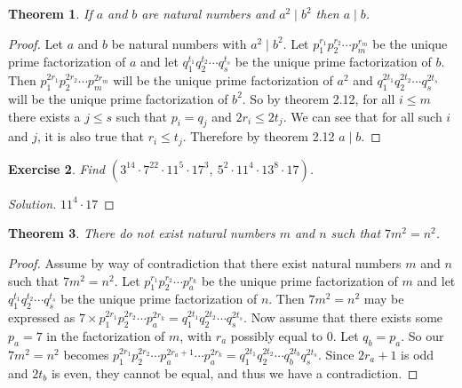 \documentclass[12pt,leqno]{article}
\numberwithin{equation}{section}
\newtheorem{thm}{Theorem}[section]
\newtheorem{exer}[thm]{Exercise}
\theoremstyle{definition}
\begin{document}
\pagebreak

\begin{thm}
If $a$ and $b$ are natural numbers and $a^2 \mid b^2$ then $a \mid b$.
\end{thm}

\begin{proof}[Proof]
Let $a$ and $b$ be natural numbers with $a^2 \mid b^2$.  Let $p_1^{r_1}p_2^{r_2}\cdots p_m^{r_m}$ be the unique prime factorization of $a$ and let $q_1^{t_1}q_2^{t_2}\cdots q_s^{t_s}$ be the unique prime factorization of $b$.  Then $p_1^{2r_1}p_2^{2r_2}\cdots p_m^{2r_m}$ will be the unique prime factorization of $a^2$ and $q_1^{2t_1}q_2^{2t_2}\cdots q_s^{2t_s}$ will be the unique prime factorization of $b^2$.  So by theorem 2.12, for all $i \leq m$ there exists a $j\leq s$ such that $p_i = q_j$ and $2r_i \leq 2t_j$.  We can see that for all such $i$ and $j$, it is also true that $r_i \leq t_j$.  Therefore by theorem 2.12 $a \mid b$.
\end{proof}


\begin{exer}
Find $(3^{14} \cdot 7^{22} \cdot 11^5 \cdot 17^3,\ 5^2 \cdot 11^4 \cdot 13^8 \cdot 17)$.
\end{exer}

\begin{proof}[Solution]
$11^4 \cdot 17$
\end{proof}

\setcounter{thm}{18}


\begin{thm}
There do not exist natural numbers $m$ and $n$ such that $7m^2 = n^2$.
\end{thm}

\begin{proof}[Proof]
Assume by way of contradiction that there exist natural numbers $m$ and $n$ such that $7m^2 = n^2$.  Let $p_1^{r_1}p_2^{r_2}\cdots p_a^{r_k}$ be the unique prime factorization of $m$ and let $q_1^{t_1}q_2^{t_2}\cdots q_s^{t_s}$ be the unique prime factorization of $n$.  Then $7m^2 = n^2$ may be expressed as $7 \times p_1^{2r_1}p_2^{2r_2}\cdots p_a^{2r_k} = q_1^{2t_1}q_2^{2t_2}\cdots q_s^{2t_s}$.  Now assume that there exists some  $p_a = 7$ in the factorization of $m$, with $r_a$ possibly equal to 0.  Let $q_b = p_a$.  So our $7m^2 = n^2$ becomes $p_1^{2r_1}p_2^{2r_2}\cdots p_a^{2r_a + 1} \cdots p_a^{2r_k} = q_1^{2t_1}q_2^{2t_2}\cdots q_b^{2t_b} q_s^{2t_s}$.  Since $2r_a + 1$ is odd and $2t_b$ is even, they cannot be equal, and thus we have a contradiction.
\end{proof}
\end{document}
